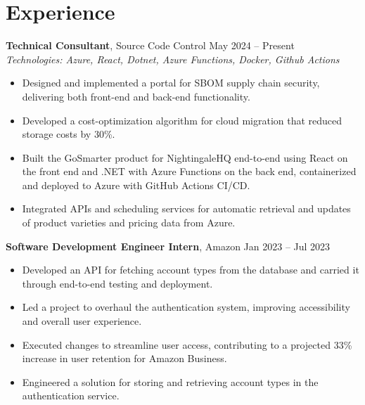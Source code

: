 \documentclass[11pt,a4paper]{article}
\begin{document}
\section{Experience}
\textbf{Technical Consultant}, Source Code Control \hfill May 2024 -- Present
\\ \textit{Technologies: Azure, React, Dotnet, Azure Functions, Docker, Github Actions}
\begin{itemize}
  \item Designed and implemented a portal for SBOM supply chain security, delivering both front-end and back-end functionality.
  \item Developed a cost-optimization algorithm for cloud migration that reduced storage costs by 30\%.
  \item Built the GoSmarter product for NightingaleHQ end-to-end using React on the front end and .NET with Azure Functions on the back end, containerized and deployed to Azure with GitHub Actions CI/CD.
  \item Integrated APIs and scheduling services for automatic retrieval and updates of product varieties and pricing data from Azure.
\end{itemize}
\vspace{2pt}
\textbf{Software Development Engineer Intern}, Amazon \hfill Jan 2023 -- Jul 2023
\begin{itemize}
  \item Developed an API for fetching account types from the database and carried it through end-to-end testing and deployment.
  \item Led a project to overhaul the authentication system, improving accessibility and overall user experience.
  \item Executed changes to streamline user access, contributing to a projected 33\% increase in user retention for Amazon Business.
  \item Engineered a solution for storing and retrieving account types in the authentication service.
\end{itemize}
\vspace{2pt}
\end{document}
